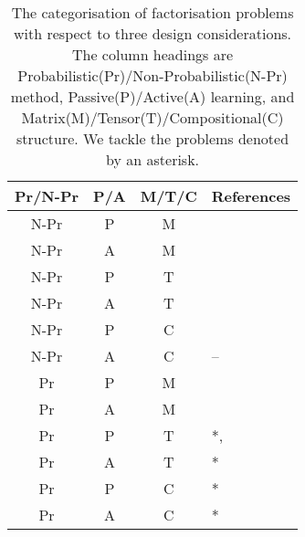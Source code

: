 
\begin{table}[t]
\centering
\caption{\label{tbl:relatedwork}The categorisation of factorisation problems with respect to 
three design considerations. The column headings are Probabilistic(Pr)/Non-Probabilistic(N-Pr) method, Passive(P)/Active(A) learning, and Matrix(M)/Tensor(T)/Compositional(C) structure. We tackle the problems denoted by an asterisk.}
\vskip 0.15in
\small
\begin{tabular}{c c c l}
Pr/N-Pr & P/A & M/T/C & References	\\ \hline \hline

N-Pr & P & M & \cite{lee1999learning}\\ \hline
N-Pr & A & M & \cite{ruchansky2015matrix}\\  \hline

N-Pr & P & T& \cite{nickel2011three}\cite{kolda2009tensor}\\ \hline
N-Pr & A & T & \cite{kajino2015active} \\  \hline
N-Pr & P & C & \cite{Neelakantan2015}\cite{guu2015traversing}\\ \hline
N-Pr & A & C & -- \\ \hline
Pr & P & M & \cite{mnih2007probabilistic}\\ \hline
Pr & A & M&  \cite{kawale2015efficient}\cite{sutherland2013active}\\ \hline

Pr & P & T& *, \cite{xiong2010temporal}\cite{schmidt2009probabilistic} \\ \hline
Pr & A & T & * \\ \hline
Pr & P & C & * \\ \hline
Pr & A & C & *
\end{tabular}
\end{table}